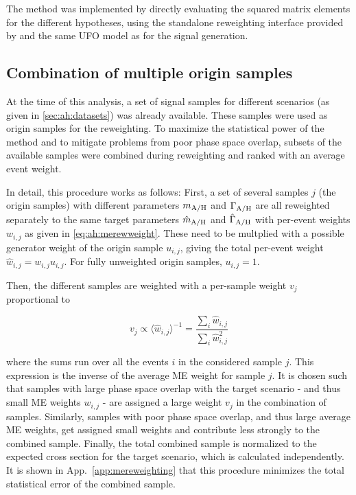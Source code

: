 The method was implemented by directly evaluating the squared matrix elements for the different \AH hypotheses, using the standalone reweighting interface provided by \amcatnlo and the same UFO model as for the signal generation. 

\subsection{Combination of multiple origin samples}

At the time of this analysis, a set of signal samples for different \AH scenarios (as given in \cref{sec:ah:datasets}) was already available. These samples were used as origin samples for the reweighting. To maximize the statistical power of the method and to mitigate problems from poor phase space overlap, subsets of the available samples were combined during reweighting and ranked with an average event weight.

In detail, this procedure works as follows: First, a set of several samples $j$ (the origin samples) with different parameters $m_{\mathrm{A/H}}$ and $\Gamma_{\mathrm{A/H}}$ are all reweighted separately to the same target parameters $\hat{m}_{\mathrm{A/H}}$ and $\hat{\Gamma}_{\mathrm{A/H}}$ with per-event weights $w_{i,j}$ as given in \cref{eq:ah:merewweight}. These need to be multplied with a possible generator weight of the origin sample $u_{i,j}$, giving the total per-event weight $\hat{w}_{i,j} = w_{i,j} u_{i,j}$. For fully unweighted origin samples, $u_{i,j} = 1$. 

Then, the different samples are weighted with a per-sample weight $v_j$ proportional to

\begin{equation}
\label{eq:ah:sampleweights}
    v_j \propto {\langle \hat{w}_{i,j} \rangle}^{-1} =  \frac{ \sum_i \hat{w}_{i,j} }{ \sum_i \hat{w}_{i,j}^2 }
\end{equation}

\noindent where the sums run over all the events $i$ in the considered sample $j$. This expression is the inverse of the average ME weight for sample $j$. It is chosen such that samples with large phase space overlap with the target \AH scenario - and thus small ME weights $w_{i,j}$ - are assigned a large weight $v_j$ in the combination of samples. Similarly, samples with poor phase space overlap, and thus large average ME weights, get assigned small weights and contribute less strongly to the combined sample. Finally, the total combined sample is normalized to the expected cross section for the target scenario, which is calculated independently. It is shown in App.~\ref{app:mereweighting} that this procedure minimizes the total statistical error of the combined sample.


